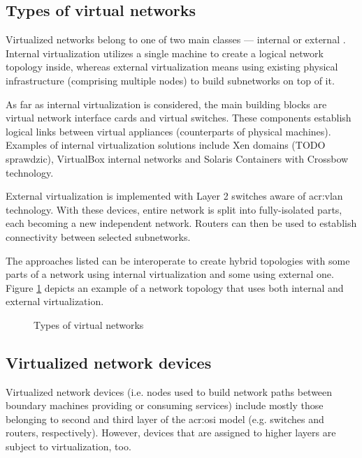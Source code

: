\documentclass[11pt]{book}
\begin{document}
      \subsection{Types of virtual networks}

        Virtualized networks belong to one of two main classes --- internal or external \cite{nsag}. Internal
        virtualization utilizes a single machine to create a logical network topology inside, whereas external
        virtualization means using existing physical infrastructure (comprising multiple nodes) to build subnetworks on
        top of it.

        As far as internal virtualization is considered, the main building blocks are virtual network interface cards
        and virtual switches. These components establish logical links between virtual appliances (counterparts of
        physical machines). Examples of internal virtualization solutions include Xen domains (TODO sprawdzic),
        VirtualBox internal networks \cite{vboxum} and Solaris Containers with Crossbow technology.

        External virtualization is implemented with Layer 2 switches aware of \gls{acr:vlan} technology. With these
        devices, entire network is split into fully-isolated parts, each becoming a new independent network. Routers can
        then be used to establish connectivity between selected subnetworks.

        The approaches listed can be interoperate to create hybrid topologies with some parts of a network using
        internal virtualization and some using external one. Figure \ref{fig:ctx:nvtypes} depicts an example of a
        network topology that uses both internal and external virtualization.
        

        \begin{figure}[H]
          \caption{Types of virtual networks}
          \label{fig:ctx:nvtypes}
        \end{figure}


      \subsection{Virtualized network devices}

        Virtualized network devices (i.e. nodes used to build network paths between boundary machines providing or
        consuming services) include mostly those belonging to second and third layer of the \gls{acr:osi} model (e.g.
        switches and routers, respectively). However, devices that are assigned to higher layers are subject to
        virtualization, too.
\end{document}
